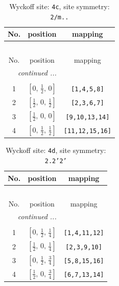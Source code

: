 \documentclass[fleqn,8pt]{jsarticle}
\begin{document}
\renewcommand{\arraystretch}{1.2}
\begin{longtable}{ccc}
\caption{Wyckoff site: {\tt 4c}, site symmetry: {\tt 2/m..}}
 \\
 \hline \hline
No. & position & mapping \\ \hline \endfirsthead

\multicolumn{2}{l}{\tablename\ \thetable{}} \\
 \hline \hline
No. & position & mapping \\ \hline \endhead

 \hline \hline
\multicolumn{2}{r}{\footnotesize\it continued ...} \\ \endfoot

 \hline \hline
\multicolumn{2}{r}{} \\ \endlastfoot

1 & $\left[ 0,\, \frac{1}{2},\, 0 \right]$ & {\tt [1,4,5,8]} \\ \hline
2 & $\left[ \frac{1}{2},\, 0,\, \frac{1}{2} \right]$ & {\tt [2,3,6,7]} \\ \hline
3 & $\left[ \frac{1}{2},\, 0,\, 0 \right]$ & {\tt [9,10,13,14]} \\ \hline
4 & $\left[ 0,\, \frac{1}{2},\, \frac{1}{2} \right]$ & {\tt [11,12,15,16]} \\
\end{longtable}
\renewcommand{\arraystretch}{1.2}
\begin{longtable}{ccc}
\caption{Wyckoff site: {\tt 4d}, site symmetry: {\tt 2.2'2'}}
 \\
 \hline \hline
No. & position & mapping \\ \hline \endfirsthead

\multicolumn{2}{l}{\tablename\ \thetable{}} \\
 \hline \hline
No. & position & mapping \\ \hline \endhead

 \hline \hline
\multicolumn{2}{r}{\footnotesize\it continued ...} \\ \endfoot

 \hline \hline
\multicolumn{2}{r}{} \\ \endlastfoot

1 & $\left[ 0,\, \frac{1}{2},\, \frac{1}{4} \right]$ & {\tt [1,4,11,12]} \\ \hline
2 & $\left[ \frac{1}{2},\, 0,\, \frac{1}{4} \right]$ & {\tt [2,3,9,10]} \\ \hline
3 & $\left[ 0,\, \frac{1}{2},\, \frac{3}{4} \right]$ & {\tt [5,8,15,16]} \\ \hline
4 & $\left[ \frac{1}{2},\, 0,\, \frac{3}{4} \right]$ & {\tt [6,7,13,14]} \\
\end{longtable}
\end{document}
